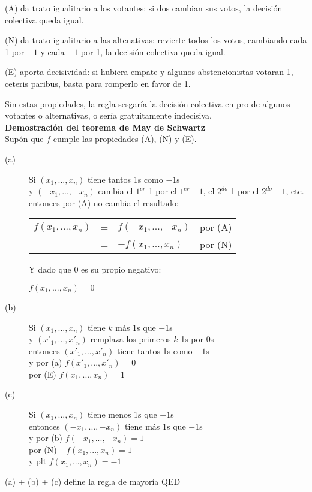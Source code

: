 \documentclass[letter,12pt]{article}
\begin{document}
(A) da trato igualitario a los votantes: si dos cambian sus votos, la decisión colectiva queda igual.

(N) da trato igualitario a las altenativas: revierte todos los votos, cambiando cada 1 por $-1$ y cada $-1$ por 1, la decisión colectiva queda igual.

(E) aporta decisividad: si hubiera empate y algunos abstencionistas votaran 1, ceteris paribus, basta para romperlo en favor de 1.

Sin estas propiedades, la regla sesgaría la decisión colectiva en pro de algunos votantes o alternativas, o sería gratuitamente indecisiva.\\


\textbf{Demostración del teorema de May de Schwartz} \\

Supón que $f$ cumple las propiedades (A), (N) y (E).

\begin{description}
\item[(a)] Si $(x_1,...,x_n)$ tiene tantos 1s como $-1$s \\
         y $(-x_1,...,-x_n)$ cambia el $1^{er}$ 1 por el $1^{er}$ $-1$, el $2^{do}$ 1 por el $2^{do}$ $-1$, etc.\\
         entonces por (A) no cambia el resultado:\\

\begin{tabular}{rcll}
$f(x_1,...,x_n)$  & = &   $f(-x_1,...,-x_n)$ & por (A) \\
  & = &   $-f(x_1,...,x_n)$   & por (N) \\
\end{tabular}

Y dado que 0 es su propio negativo:

$f(x_1,...,x_n) = 0$ 


\item[(b)] Si $(x_1,...,x_n)$ tiene $k$ más 1s que $-1$s \\
  y $(x'_1,...,x'_n)$ remplaza los primeros $k$ 1s por 0s \\
  entonces $(x'_1,...,x'_n)$ tiene tantos 1s como $-1$s \\
  y por (a) $f(x'_1,...,x'_n) = 0$ \\
  por (E) $f(x_1,...,x_n) = 1$

\item[(c)] Si $(x_1,...,x_n)$ tiene menos 1s que $-1$s \\
   entonces $(-x_1,...,-x_n)$ tiene más 1s que $-1$s \\
   y por (b) $f(-x_1,...,-x_n) = 1$ \\
   por (N) $-f(x_1,...,x_n) = 1$ \\
   y plt $f(x_1,...,x_n) = -1$ \\
\end{description}

(a) + (b) + (c) define la regla de mayoría QED
\end{document}

